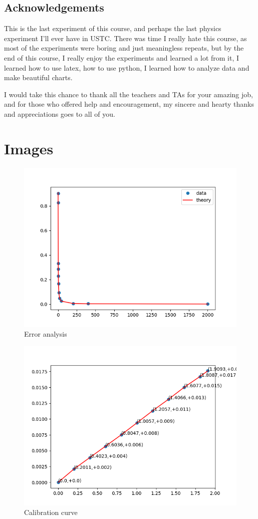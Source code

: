 \documentclass[a4paper]{article}
\begin{document}
\begin{multicols*}{2}
    \section*{Acknowledgements}
    This is the last experiment of this course, and perhaps the last physics experiment I'll ever have in USTC. There was time I really hate this course, as most of the experiments were boring and just meaningless repeats, but by the end of this course, I really enjoy the experiments and learned a lot from it, I learned how to use latex, how to use python, I learned how to analyze data and make beautiful charts.

    I would take this chance to thank all the teachers and TAs for your amazing job, and for those who offered help and encouragement, my sincere and hearty thanks and appreciations goes to all of you.
    \newpage
\end{multicols*}
\section*{Images}
\begin{figure}[H]
    \centering
    \includegraphics[width=0.6\linewidth]{./img/Fig.4.png}
    \caption{Error analysis}
\end{figure}
\begin{figure}[H]
    \centering
    \includegraphics[width=0.6\linewidth]{./img/Fig.5.png}
    \caption{Calibration curve}
\end{figure}
\end{document}
